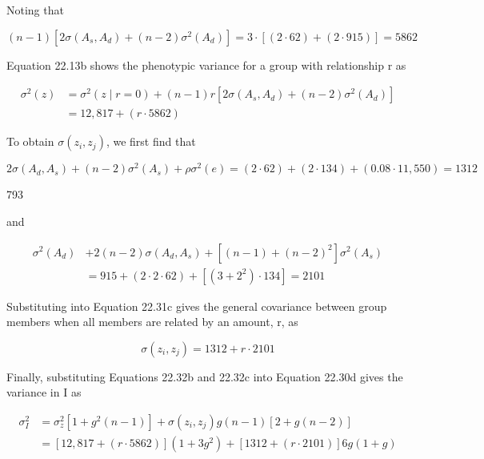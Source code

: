 \documentclass{article}
\begin{document}
Noting that

\begin{equation}
(n-1)\left[2\sigma(A_{s},A_{d})+(n-2)\sigma^{2}(A_{d})\right]=3\cdot\left[(2\cdot62)+(2\cdot915)\right]=5862
\end{equation}

Equation 22.13b shows the phenotypic variance for a group with relationship r as

\begin{equation}
\begin{aligned}\sigma^{2}(z)&=\sigma^{2}(z\mid r=0)+(n-1)r\left[2\sigma(A_{s},A_{d})+(n-2)\sigma^{2}(A_{d})\right]\\&=12,817+(r\cdot5862)\end{aligned}
\tag{22.32b}
\label{eq:22_32b}
\end{equation}

To obtain  $ \sigma(z_{i}, z_{j}) $, we first find that

\begin{equation}
2\sigma(A_{d},A_{s})+(n-2)\sigma^{2}(A_{s})+\rho\sigma^{2}(e)=(2\cdot62)+(2\cdot134)+(0.08\cdot11,550)=1312
\end{equation}

793

and

\begin{equation}
\begin{aligned}\sigma^{2}(A_{d})&+2(n-2)\sigma(A_{d},A_{s})+\left[(n-1)+(n-2)^{2}\right]\sigma^{2}(A_{s})\\&=915+(2\cdot2\cdot62)+\left[(3+2^{2})\cdot134\right]=2101\end{aligned}
\end{equation}

Substituting into Equation 22.31c gives the general covariance between group members when all members are related by an amount, r, as

\begin{equation}
\sigma(z_{i},z_{j})=1312+r\cdot2101
\tag{22.32c}
\label{eq:22_32c}
\end{equation}

Finally, substituting Equations 22.32b and 22.32c into Equation 22.30d gives the variance in I as

\begin{equation}
\begin{aligned}\sigma_{I}^{2}&=\sigma_{z}^{2}\left[1+g^{2}(n-1)\right]+\sigma(z_{i},z_{j})g(n-1)\left[2+g(n-2)\right]\\&=\left[12,817+(r\cdot5862)\right]\left(1+3g^{2}\right)+\left[1312+(r\cdot2101)\right]6g\left(1+g\right)\end{aligned}
\tag{22.32d}
\label{eq:22_32d}
\end{equation}
\end{document}
